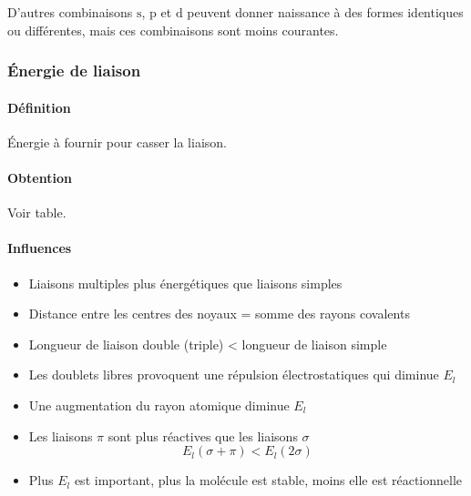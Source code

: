 \documentclass[11pt,a4paper,french]{article}
\newcommand\sorb{\mathrm{s}}
\newcommand\porb{\mathrm{p}}
\newcommand\dorb{\mathrm{d}}
\begin{document}
D'autres combinaisons $\sorb$, $\porb$ et $\dorb$ peuvent donner naissance à des formes identiques ou différentes, mais ces combinaisons sont moins courantes.

\subsubsection{\'Energie de liaison}
\label{sec:E_l}

\paragraph{Définition}
\'Energie à fournir pour casser la liaison.

\paragraph{Obtention}
Voir table.

\paragraph{Influences}
\begin{itemize}
	\item Liaisons multiples plus énergétiques que liaisons simples
	\item Distance entre les centres des noyaux = somme des rayons covalents
	\item Longueur de liaison double (triple) < longueur de liaison simple
	\item Les doublets libres provoquent une répulsion électrostatiques qui diminue $E_l$
	\item Une augmentation du rayon atomique diminue $E_l$
	\item Les liaisons $\pi$ sont plus réactives que les liaisons $\sigma$
		\[ E_l(\sigma + \pi) <  E_l(2\sigma) \]
	\item Plus $E_l$ est important, plus la molécule est stable, moins elle est réactionnelle
\end{itemize}
\end{document}
